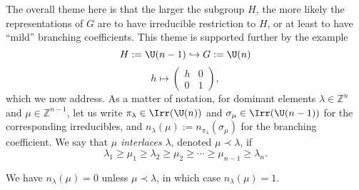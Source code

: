 \documentclass[reqno]{amsart} 
\begin{document}
The overall theme here is that the larger the subgroup $H$, the more likely the representations of $G$ are to have irreducible restriction to $H$, or at least to have ``mild'' branching coefficients.  This theme is supported further by the example
\begin{equation*}
  H := \U(n-1)
  \hookrightarrow G := \U(n)
\end{equation*}
\begin{equation*}
  h \mapsto 
\begin{pmatrix}
    h & 0 \\
    0 & 1
  \end{pmatrix}
,
\end{equation*}
which we now address.  As a matter of notation, for dominant elements $\lambda \in \mathbb{Z}^n$ and $\mu \in \mathbb{Z}^{n-1}$, let us write $\pi_\lambda \in \Irr(\U(n))$ and $\sigma_{\mu} \in \Irr(\U(n-1))$ for the corresponding irreducibles, and $n_\lambda(\mu) := n_{\pi_\lambda}(\sigma_\mu)$ for the branching coefficient.  We say that $\mu$ \emph{interlaces} $\lambda$, denoted $\mu \prec \lambda$, if
\begin{equation*}
  \lambda_1 \geq \mu_1 \geq \lambda_2 \geq \mu_2
  \geq \dotsb \geq \mu_{n-1} \geq \lambda_n.
\end{equation*}
\begin{theorem}
  We have $n_\lambda(\mu) = 0$ unless $\mu \prec \lambda$, in which case $n_\lambda(\mu) = 1$.
\end{theorem}
\end{document}

